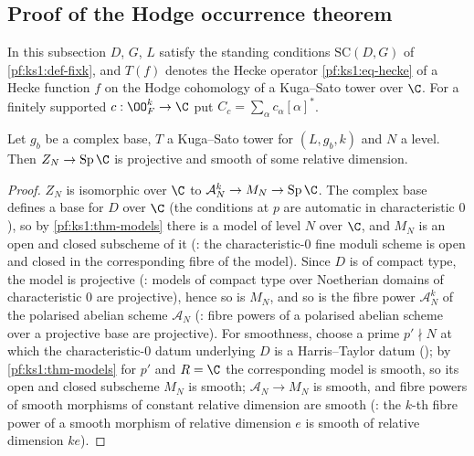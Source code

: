 \subsection{Proof of the Hodge occurrence theorem}\label{pf:ks1:sec-proof}

In this subsection $D$, $G$, $L$ satisfy the standing conditions $\mathrm{SC}(D,G)$ of \cref{pf:ks1:def-fixk}, and $T(f)$ denotes the
Hecke operator \eqref{pf:ks1:eq-hecke} of a Hecke function $f$ on the Hodge cohomology of a Kuga--Sato tower over $\C$. For a finitely
supported $c:\OO_F^k\to\C$ put $C_c=\sum_\alpha c_\alpha[\alpha]^*$.

\begin{lemma}\label{pf:ks1:lem-ksproj}
Let $g_b$ be a complex base, $T$ a Kuga--Sato tower for $(L,g_b,k)$ and $N$ a level. Then $Z_N\to\ksoneSp\C$ is projective and smooth of
some relative dimension.
\end{lemma}

\begin{proof}
$Z_N$ is isomorphic over $\C$ to $\mathcal A_N^k\to M_N\to\ksoneSp\C$. The complex base defines a base for $D$ over $\C$ (the conditions at $p$
are automatic in characteristic $0$), so by \cref{pf:ks1:thm-models} there is a model of level $N$ over $\C$, and $M_N$ is an open and closed
subscheme of it (: the characteristic-$0$ fine moduli scheme is open
and closed in the corresponding fibre of the model). Since $D$ is of compact type, the model is projective
(: models of compact type over Noetherian domains of characteristic $0$ are
projective), hence so is $M_N$, and so is the fibre power $\mathcal A_N^k$ of the polarised abelian scheme $\mathcal A_N$
(: fibre powers of a polarised abelian scheme over a projective base are projective). For
smoothness, choose a prime $p'\nmid N$ at which the characteristic-$0$ datum underlying $D$ is a Harris--Taylor datum
(); by \cref{pf:ks1:thm-models} for $p'$ and $R=\C$ the corresponding model is smooth, so its
open and closed subscheme $M_N$ is smooth; $\mathcal A_N\to M_N$ is smooth, and fibre powers of smooth morphisms of constant relative dimension
are smooth (: the $k$-th fibre power of a smooth morphism of relative dimension $e$ is
smooth of relative dimension $ke$).
\end{proof}

